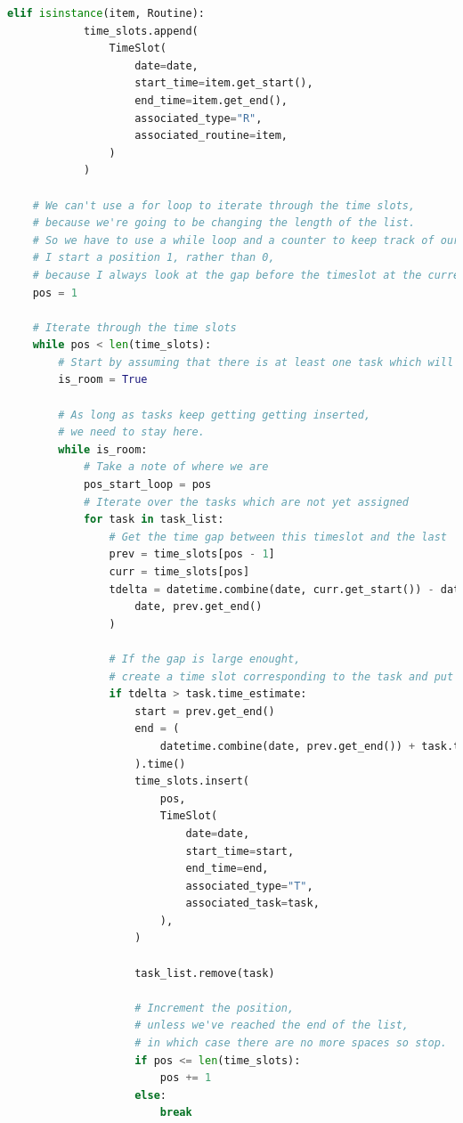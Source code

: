 \documentclass{article}
\begin{document}
\begin{lstlisting}[language=Python]
        elif isinstance(item, Routine):
            time_slots.append(
                TimeSlot(
                    date=date,
                    start_time=item.get_start(),
                    end_time=item.get_end(),
                    associated_type="R",
                    associated_routine=item,
                )
            )

    # We can't use a for loop to iterate through the time slots,
    # because we're going to be changing the length of the list.
    # So we have to use a while loop and a counter to keep track of our position.
    # I start a position 1, rather than 0,
    # because I always look at the gap before the timeslot at the current position.
    pos = 1

    # Iterate through the time slots
    while pos < len(time_slots):
        # Start by assuming that there is at least one task which will fit in this time gap
        is_room = True

        # As long as tasks keep getting getting inserted,
        # we need to stay here.
        while is_room:
            # Take a note of where we are
            pos_start_loop = pos
            # Iterate over the tasks which are not yet assigned
            for task in task_list:
                # Get the time gap between this timeslot and the last
                prev = time_slots[pos - 1]
                curr = time_slots[pos]
                tdelta = datetime.combine(date, curr.get_start()) - datetime.combine(
                    date, prev.get_end()
                )

                # If the gap is large enought,
                # create a time slot corresponding to the task and put it here
                if tdelta > task.time_estimate:
                    start = prev.get_end()
                    end = (
                        datetime.combine(date, prev.get_end()) + task.time_estimate
                    ).time()
                    time_slots.insert(
                        pos,
                        TimeSlot(
                            date=date,
                            start_time=start,
                            end_time=end,
                            associated_type="T",
                            associated_task=task,
                        ),
                    )

                    task_list.remove(task)

                    # Increment the position,
                    # unless we've reached the end of the list,
                    # in which case there are no more spaces so stop.
                    if pos <= len(time_slots):
                        pos += 1
                    else:
                        break


\end{lstlisting}
\end{document}
